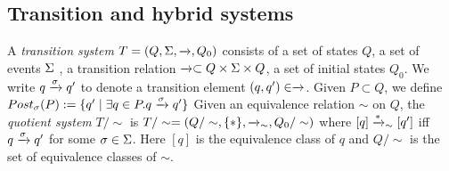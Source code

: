 \subsection{Transition and hybrid systems}
\label{sec:transition systems}

%
\begin{defn}
	\label{defn:transition system}
	A \emph{transition system} $T = (Q,\Sigma,\xrightarrow{},Q_0)$ consists of a set of states $Q$, a set of events $\Sigma$ , a transition relation $\xrightarrow{} \subset Q \times \Sigma \times Q$, a set of initial states $Q_0$. 
	We write $q \xrightarrow{\sigma}q'$ to denote a transition element $(q,q') \in \xrightarrow{}$.
	Given $P\subset Q$, we define $Post_\sigma(P) := \{q'\;|\;\exists q\in P. q \xrightarrow{\sigma}q'\}$
	Given an equivalence relation $\sim$ on $Q$, the \emph{quotient system} $T/\sim$ is
	$T/\sim = (Q/\sim, \{*\}, \xrightarrow{}_\sim, Q_0/\sim)$
	where $[q] \xrightarrow{*}_\sim [q']$ iff $q \xrightarrow{\sigma} q'$ for some $\sigma \in \Sigma$.
	Here $[q]$ is the equivalence class of $q$ and $Q/\sim$ is the set of equivalence classes of $\sim$.
\end{defn}

